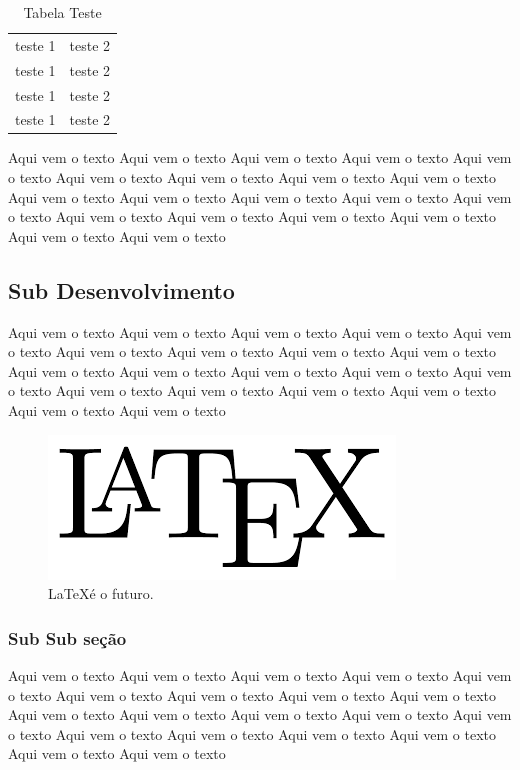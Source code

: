 \documentclass[a4paper, 12pt]{article}
\begin{document}
\begin{table}
	\centering
	\begin{tabular}{|c|c|}
		teste 1 & teste 2\\
		teste 1 & teste 2\\
		teste 1 & teste 2\\
		teste 1 & teste 2\\
	
	\end{tabular}
	\caption{Tabela Teste}
	\label{tabela-teste}
\end{table}

Aqui vem o texto Aqui vem o texto Aqui vem o texto Aqui vem o texto Aqui vem o texto 
Aqui vem o texto Aqui vem o texto Aqui vem o texto Aqui vem o texto Aqui vem o texto 
Aqui vem o texto Aqui vem o texto Aqui vem o texto Aqui vem o texto Aqui vem o texto 
Aqui vem o texto Aqui vem o texto Aqui vem o texto Aqui vem o texto Aqui vem o texto\cite{meuatalhoArticle} 
\subsection{Sub Desenvolvimento}
Aqui vem o texto Aqui vem o texto Aqui vem o texto Aqui vem o texto Aqui vem o texto 
Aqui vem o texto Aqui vem o texto Aqui vem o texto Aqui vem o texto Aqui vem o texto 
Aqui vem o texto Aqui vem o texto Aqui vem o texto Aqui vem o texto Aqui vem o texto 
Aqui vem o texto Aqui vem o texto Aqui vem o texto Aqui vem o texto Aqui vem o texto 

\begin{figure}[htb]
	\centering
	\includegraphics[scale=0.4]{Imagens/latex.png}
	\caption{\LaTeX é o futuro.}
	\label{latec_figure}
\end{figure}

\subsubsection{Sub Sub seção}
Aqui vem o texto Aqui vem o texto Aqui vem o texto Aqui vem o texto Aqui vem o texto 
Aqui vem o texto Aqui vem o texto Aqui vem o texto Aqui vem o texto Aqui vem o texto 
Aqui vem o texto Aqui vem o texto Aqui vem o texto Aqui vem o texto Aqui vem o texto 
Aqui vem o texto Aqui vem o texto Aqui vem o texto Aqui vem o texto Aqui vem o texto 
\end{document}
